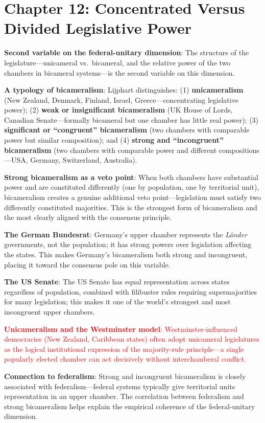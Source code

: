 \documentclass[12pt]{article}
\begin{document}
\section{Chapter 12: Concentrated Versus Divided Legislative Power}

\begin{itemize}[leftmargin=*, itemsep=4pt]
    \item \textbf{Second variable on the federal-unitary dimension}: The structure of the legislature---unicameral vs.\ bicameral, and the relative power of the two chambers in bicameral systems---is the second variable on this dimension.
    \item \textbf{A typology of bicameralism}: Lijphart distinguishes: (1) \textbf{unicameralism} (New Zealand, Denmark, Finland, Israel, Greece---concentrating legislative power); (2) \textbf{weak or insignificant bicameralism} (UK House of Lords, Canadian Senate---formally bicameral but one chamber has little real power); (3) \textbf{significant or ``congruent'' bicameralism} (two chambers with comparable power but similar composition); and (4) \textbf{strong and ``incongruent'' bicameralism} (two chambers with comparable power and different compositions---USA, Germany, Switzerland, Australia).
    \item \textbf{Strong bicameralism as a veto point}: When both chambers have substantial power and are constituted differently (one by population, one by territorial unit), bicameralism creates a genuine additional veto point---legislation must satisfy two differently constituted majorities. This is the strongest form of bicameralism and the most clearly aligned with the consensus principle.
    \item \textbf{The German Bundesrat}: Germany's upper chamber represents the \textit{Länder} governments, not the population; it has strong powers over legislation affecting the states. This makes Germany's bicameralism both strong and incongruent, placing it toward the consensus pole on this variable.
    \item \textbf{The US Senate}: The US Senate has equal representation across states regardless of population, combined with filibuster rules requiring supermajorities for many legislation; this makes it one of the world's strongest and most incongruent upper chambers.
    \textcolor{red}{\item \textbf{Unicameralism and the Westminster model}: Westminster-influenced democracies (New Zealand, Caribbean states) often adopt unicameral legislatures as the logical institutional expression of the majority-rule principle---a single popularly elected chamber can act decisively without interchamberal conflict.}
    \item \textbf{Connection to federalism}: Strong and incongruent bicameralism is closely associated with federalism---federal systems typically give territorial units representation in an upper chamber. The correlation between federalism and strong bicameralism helps explain the empirical coherence of the federal-unitary dimension.
\end{itemize}
\end{document}
